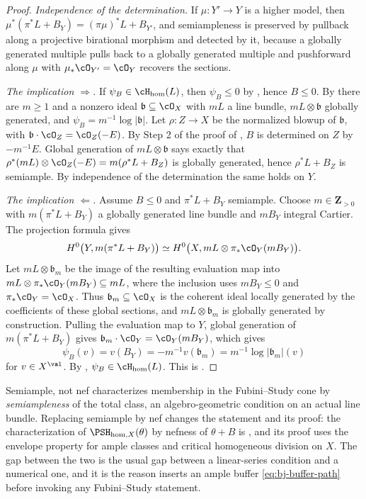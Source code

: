 \begin{proof}
\emph{Independence of the determination.}  If $\mu:Y'\to Y$ is a higher
model, then $\mu^*(\pi^*L+B_Y)=(\pi\mu)^*L+B_{Y'}$, and semiampleness is
preserved by pullback along a projective birational morphism and detected by
it, because a globally generated multiple pulls back to a globally generated
multiple and pushforward along $\mu$ with $\mu_*\cO_{Y'}=\cO_Y$ recovers
the sections.

\emph{The implication $\Rightarrow$.}  If
$\psi_B\in\cH_{\mathrm{hom}}(L)$, then $\psi_B\leq0$ by
, hence $B\leq0$.  By
 there are $m\geq1$ and a nonzero ideal
$\mathfrak b\subseteq\cO_X$ with $mL$ a line bundle,
$mL\otimes\mathfrak b$ globally generated, and
$\psi_B=m^{-1}\log|\mathfrak b|$.  Let $\rho:Z\to X$ be the normalized
blowup of $\mathfrak b$, with $\mathfrak b\cdot\cO_Z=\cO_Z(-E)$.  By
Step 2 of the proof of ,
$B$ is determined on $Z$ by $-m^{-1}E$.  Global generation of
$mL\otimes\mathfrak b$ says exactly that
$\rho^*(mL)\otimes\cO_Z(-E)=m(\rho^*L+B_Z)$ is globally generated, hence
$\rho^*L+B_Z$ is semiample.  By independence of the determination the
same holds on $Y$.

\emph{The implication $\Leftarrow$.}  Assume $B\leq0$ and
$\pi^*L+B_Y$ semiample.  Choose $m\in\mathbf Z_{>0}$ with
$m(\pi^*L+B_Y)$ a globally generated line bundle and $mB_Y$ integral
Cartier.  The projection formula gives
\[
 H^0\bigl(Y,m(\pi^*L+B_Y)\bigr)
 \simeq H^0\bigl(X,mL\otimes\pi_*\cO_Y(mB_Y)\bigr).
\]
Let $mL\otimes\mathfrak b_m$ be the image of the resulting evaluation
map into
$mL\otimes\pi_*\cO_Y(mB_Y)\subseteq mL$, where the inclusion uses
$mB_Y\leq0$ and $\pi_*\cO_Y=\cO_X$.  Thus
$\mathfrak b_m\subseteq\cO_X$ is the coherent ideal locally generated by
the coefficients of these global sections, and
$mL\otimes\mathfrak b_m$ is globally generated by construction.
Pulling the evaluation map to $Y$, global generation of
$m(\pi^*L+B_Y)$ gives
$\mathfrak b_m\cdot\cO_Y=\cO_Y(mB_Y)$, which gives
\[
 \psi_B(v)=v(B_Y)=-m^{-1}v(\mathfrak b_m)=m^{-1}\log|\mathfrak b_m|(v)
\]
for $v\in X^{\val}$.  By ,
$\psi_B\in\cH_{\mathrm{hom}}(L)$.  This is
\cite[Lemma~6.34]{BJ22}.
\end{proof}

\begin{warning}{Semiample, not nef}
 characterizes membership in the
Fubini--Study cone by \emph{semiampleness} of the total class, an
algebro-geometric condition on an actual line bundle.  Replacing semiample
by nef changes the statement and its proof: the characterization of
$\PSH_{\mathrm{hom},X}(\theta)$ by nefness of $\theta+B$ is
, and its proof uses the envelope
property for ample classes and critical homogeneous division on $X$.
The gap between the two is the usual gap
between a linear-series condition and a numerical one, and it is the reason
 inserts an ample buffer
\eqref{eq:bj-buffer-path} before invoking any Fubini--Study statement.
\end{warning}

